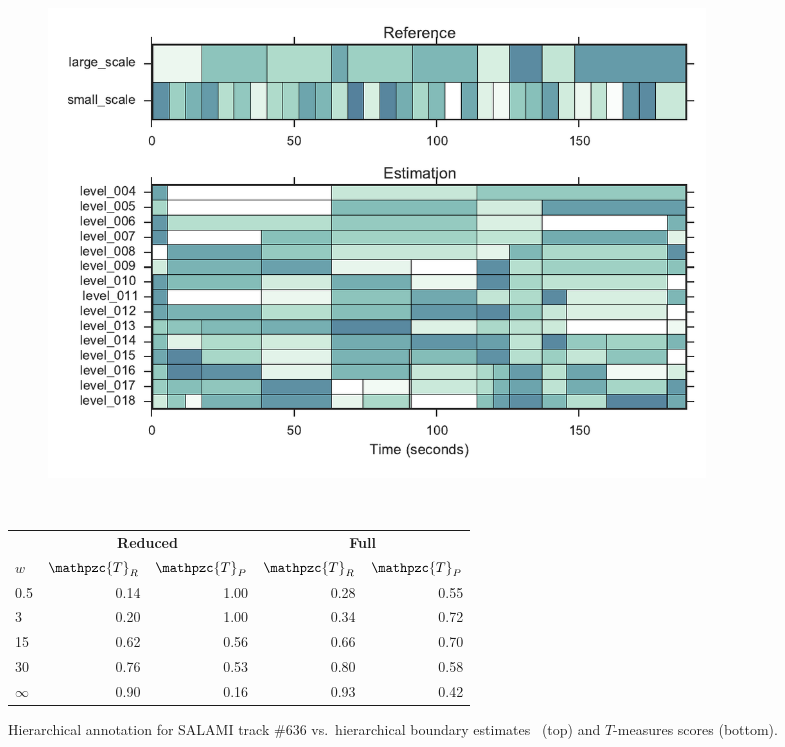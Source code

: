 \documentclass{article}
\def\shag{\ensuremath{\mathpzc{T}}}
\begin{document}
\begin{figure}[t]
  \centering
  \begin{subfigure}{0.5\textwidth}
    \centering
    \includegraphics[width=0.94\textwidth]{figs/SALAMI-OLDA.pdf}
  \end{subfigure}%
  \\
  \begin{minipage}{0.5\textwidth}
    \small
    \centering
    \vspace{10pt}
    \begin{tabular}{l|rr|rr}
      & \multicolumn{2}{c|}{\textbf{Reduced}} & \multicolumn{2}{c}{\textbf{Full}} \\
      $w$       & $\shag_R$    & $\shag_P$  & $\shag_R$ & $\shag_P$    \\
      \hline
      0.5       & 0.14       & 1.00  & 0.28 & 0.55 \\
      3         & 0.20       & 1.00  & 0.34 & 0.72    \\
      15        & 0.62       & 0.56  & 0.66 & 0.70 \\
      30        & 0.76       & 0.53  & 0.80 & 0.58  \\
      $\infty$  & 0.90       & 0.16  & 0.93 & 0.42
  \end{tabular}
  \end{minipage}
  \caption{Hierarchical annotation for SALAMI track \#636 vs.\ hierarchical boundary
  estimates~\cite{McFee2014} (top) and $T$-measures scores (bottom).}
  \label{fig:SALAMI-OLDA}
\end{figure}

\end{document}
